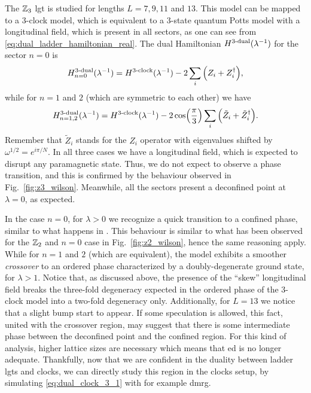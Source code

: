 The $\Z_3$ \ac{lgt} is studied for lengths $L=7,9,11$ and $13$.
This model can be mapped to a $3$-clock model, which is equivalent to a $3$-state quantum Potts model with a longitudinal field, which is present in all sectors, as one can see from \eqref{eq:dual_ladder_hamiltonian_real}.
The dual Hamiltonian $\HamilDual[3](\lambda^{-1})$ for the sector $n=0$ is
\begin{equation}
    \HamilDual[3]_{n=0}(\lambda^{-1}) = \HamilClock[3](\lambda^{-1}) - 2 \sum_{i} \qty(Z_i + Z_i^{\dagger}),
\end{equation}
while for $n=1$ and $2$ (which are symmetric to each other) we have
\begin{equation}
    \HamilDual[3]_{n=1,2}(\lambda^{-1}) = \HamilClock[3](\lambda^{-1}) - 2 \cos( \frac{\pi}{3} ) \sum_{i} \qty(\tilde{Z}_i + \tilde{Z}_i^{\dagger}).
    \label{eq:dual_clock_3_1}
\end{equation}
Remember that $\tilde{Z}_i$ stands for the $Z_i$ operator with eigenvalues shifted by $\omega^{1/2} = e^{i \pi /N}$.
In all three cases we have a longitudinal field, which is expected to disrupt any paramagnetic state.
Thus, we do not expect to observe a phase transition, and this is confirmed by the behaviour observed in Fig.~\ref{fig:z3_wilson}.
Meanwhile, all the sectors present a deconfined point at $\lambda = 0$, as expected.

In the case $n=0$, for $\lambda > 0$ we recognize a quick transition to a confined phase, similar to what happens in \cite{burrello2021ladder}.
This behaviour is similar to what has been observed for the $\Z_2$ and $n=0$ case in Fig.~\ref{fig:z2_wilson}, hence the same reasoning apply.
While for $n=1$ and $2$ (which are equivalent), the model exhibits a smoother \emph{crossover} to an ordered phase characterized by a doubly-degenerate ground state, for $\lambda > 1$.
Notice that, as discussed above,  the presence of the ``skew'' longitudinal field breaks the three-fold degeneracy expected in the ordered phase of the $3$-clock model into a two-fold degeneracy only.
Additionally, for $L=13$ we notice that a slight bump start to appear.
If some speculation is allowed, this fact, united with the crossover region, may suggest that there is some intermediate phase between the deconfined point and the confined region.
For this kind of analysis, higher lattice sizes are necessary which means that \ac{ed} is no longer adequate.
Thankfully, now that we are confident in the duality between ladder \acp{lgt} and \acp{clock}, we can directly study this region in the \acp{clock} setup, by simulating \eqref{eq:dual_clock_3_1} with for example \ac{dmrg}.



